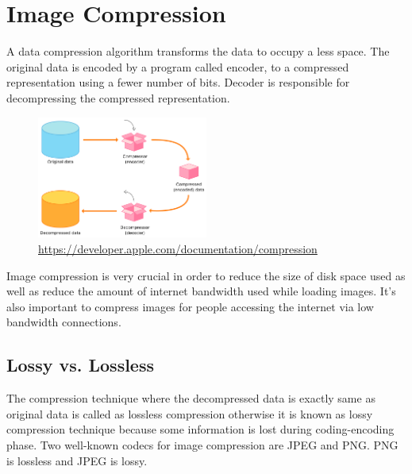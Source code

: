 \chapter{Image Compression}

A data compression algorithm transforms the data to occupy a less space. The original data is encoded by a program called encoder, to a compressed representation using a fewer number of bits. Decoder is responsible for decompressing the compressed representation. 

\begin{figure}[!ht]
    \centering
    \includegraphics[width=0.50\textwidth]{fig/2-1.png}
    {\url{https://developer.apple.com/documentation/compression}}
    \label{fig:phasesCompression}
\end{figure}

Image compression is very crucial in order to reduce the size of disk space used as well as reduce the amount of internet bandwidth used while loading images. It’s also important to compress images for people accessing the internet via low bandwidth connections.

\section{Lossy vs. Lossless}

The compression technique where the decompressed data is exactly same as original data is called as lossless compression otherwise it is known as lossy compression technique because some information is lost during coding-encoding phase. Two well-known codecs for image compression are JPEG and PNG. PNG is lossless and JPEG is lossy.

\vspace{2em}

